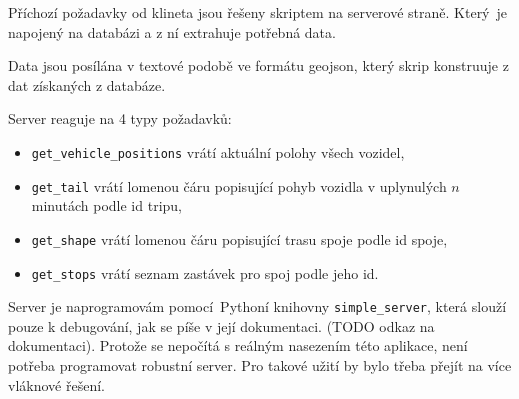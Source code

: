 Příchozí požadavky od klineta jsou řešeny skriptem na serverové straně. Který je napojený na databázi a z ní extrahuje potřebná data.

\bigbreak

Data jsou posílána v textové podobě ve formátu \gls{geojson}, který skrip konstruuje z dat získaných z databáze.

\bigbreak

Server reaguje na 4 typy požadavků:

\begin{itemize}
	\item \verb-get_vehicle_positions- vrátí aktuální polohy všech vozidel,

	\item \verb-get_tail- vrátí lomenou čáru popisující pohyb vozidla v uplynulých $n$ minutách podle id tripu,

	\item \verb-get_shape- vrátí lomenou čáru popisující trasu spoje podle id spoje,

	\item \verb-get_stops- vrátí seznam zastávek pro spoj podle jeho id.
\end{itemize}

\bigbreak

Server je naprogramovám pomocí Pythoní knihovny \verb-simple_server-, která slouží pouze k debugování, jak se píše v její dokumentaci. (TODO odkaz na dokumentaci). Protože se nepočítá s reálným nasezením této aplikace, není potřeba programovat robustní server. Pro takové užití by bylo třeba přejít na více vláknové řešení.























